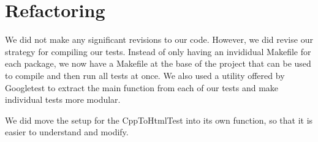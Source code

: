 \section{Refactoring}
We did not make any significant revisions to our code. However, we did revise our strategy for compiling our tests. Instead of only having an invididual Makefile for each package, we now have a Makefile at the base of the project that can be used to compile and then run all tests at once. We also used a utility offered by Googletest to extract the main function from each of our tests and make individual tests more modular.

We did move the setup for the CppToHtmlTest into its own function, so that it is easier to understand and modify.
